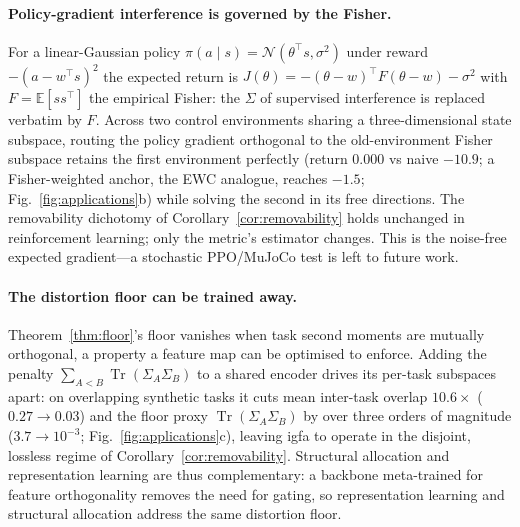 \documentclass[10pt,a4paper]{article}
\theoremstyle{plain}
\theoremstyle{definition}
\newcommand{\Sig}{\Sigma}
\newcommand{\IGFA}{igfa}
\begin{document}
\paragraph{Policy-gradient interference is governed by the Fisher.} For a linear-Gaussian
policy $\pi(a\mid s)=\mathcal N(\theta^\top s,\sigma^2)$ under reward $-(a-w^\top s)^2$ the
expected return is $J(\theta)=-(\theta-w)^\top F(\theta-w)-\sigma^2$ with $F=\mathbb E[ss^\top]$
the empirical Fisher: the $\Sig$ of supervised interference is replaced verbatim by $F$. Across
two control environments sharing a three-dimensional state subspace, routing the policy gradient
orthogonal to the old-environment Fisher subspace retains the first environment perfectly
(return $0.000$ vs naive $-10.9$; a Fisher-weighted anchor, the EWC analogue, reaches $-1.5$;
Fig.~\ref{fig:applications}b) while solving the second in its free directions. The removability dichotomy of
Corollary~\ref{cor:removability} holds unchanged in reinforcement learning; only the metric's
estimator changes. This is the noise-free expected gradient---a stochastic PPO/MuJoCo test is
left to future work.

\paragraph{The distortion floor can be trained away.} Theorem~\ref{thm:floor}'s floor vanishes
when task second moments are mutually orthogonal, a property a feature map can be optimised to
enforce. Adding the penalty $\sum_{A<B}\operatorname{Tr}(\Sig_A\Sig_B)$ to a shared encoder
drives its per-task subspaces apart: on overlapping synthetic tasks it cuts mean inter-task
overlap $10.6\times$ ($0.27\to0.03$) and the floor proxy $\operatorname{Tr}(\Sig_A\Sig_B)$ by
over three orders of magnitude ($3.7\to10^{-3}$; Fig.~\ref{fig:applications}c), leaving \IGFA{}
to operate in the disjoint, lossless regime of Corollary~\ref{cor:removability}. Structural allocation and representation
learning are thus complementary: a backbone meta-trained for feature orthogonality removes the
need for gating, so representation learning and structural allocation address the same
distortion floor.
\end{document}
